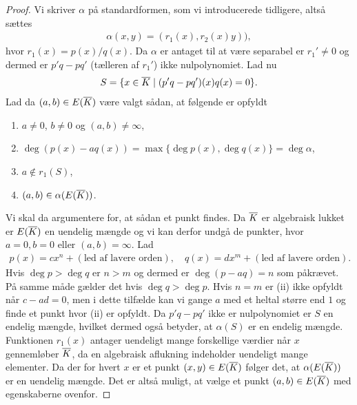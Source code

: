 \begin{proof}
Vi skriver $\alpha$ på standardformen, som vi introducerede tidligere, altså
sættes
\begin{align*}
	\alpha(x, y) = (r_1(x), r_2(x) y)),
\end{align*}
hvor $r_1(x) = p(x)/q(x)$. Da $\alpha$ er antaget til at være separabel er 
$r_1' \neq 0$ og dermed er $p'q-pq'$ (tælleren af $r_{1}'$) ikke nulpolynomiet. Lad nu
\begin{align*}
	S = \{ x \in \overline{K} \mid (p'q - pq')(x)q(x) = 0 \}.
\end{align*}
Lad da $(a, b) \in E(\overline{K})$ være valgt sådan, at følgende er opfyldt
\begin{enumerate}
	\item $a \neq 0$, $b \neq 0$ og $(a, b) \neq \infty$,
	\item $\deg (p(x) - aq(x)) = \max \{ \deg p(x), \deg q(x) \} = \deg \alpha$,
	\item $a \notin r_1(S)$,
	\item $(a, b) \in \alpha(E(\overline{K}))$.
\end{enumerate}
Vi skal da argumentere for, at sådan et punkt findes. Da $\overline{K}$ er algebraisk lukket er $E(\overline{K})$ en uendelig mængde og vi kan derfor undgå de punkter, hvor $a=0, b=0$ eller $(a, b) = \infty$. Lad 
\begin{align*}
	p(x)=cx^n + (\text{led af lavere orden}), \quad 
	q(x)=dx^m + (\text{led af lavere orden}).
\end{align*} 
Hvis $\deg p > \deg q$ er $n > m$ og dermed er $\deg(p-aq)=n$ som påkrævet. På samme måde gælder det hvis $\deg q > \deg p$. Hvis $n = m$ er (ii) ikke opfyldt når 
$c-ad = 0$, men i dette tilfælde kan vi gange $a$ med et heltal større end $1$ og finde et punkt hvor (ii) er opfyldt. 
Da $p'q-pq'$ ikke er 
nulpolynomiet er $S$ en endelig mængde, hvilket dermed også betyder, at 
$\alpha(S)$ er en endelig mængde. Funktionen $r_1(x)$ antager uendeligt 
mange forskellige værdier når $x$ gennemløber $\overline{K}$, da en algebraisk aflukning indeholder uendeligt mange elementer. Da der for hvert $x$ er et punkt $(x, y) \in E(\overline{K})$ følger det, at $\alpha(E(\overline{K}))$ er en uendelig mængde. Det er altså muligt, at vælge et punkt $(a, b) \in E(\overline{K})$ med egenskaberne ovenfor.


\end{proof}
